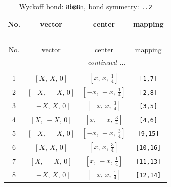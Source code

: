 \documentclass[fleqn,8pt]{jsarticle}
\begin{document}
\begin{longtable}{cccc}
\caption{Wyckoff bond: {\tt 8b@8n}, bond symmetry: {\tt ..2}}
 \\
 \hline \hline
No. & vector & center & mapping \\ \hline \endfirsthead

\multicolumn{3}{l}{\tablename\ \thetable{}} \\
 \hline \hline
No. & vector & center & mapping \\ \hline \endhead

 \hline \hline
\multicolumn{3}{r}{\footnotesize\it continued ...} \\ \endfoot

 \hline \hline
\multicolumn{3}{r}{} \\ \endlastfoot

1 & $\left[ X,\, X,\, 0 \right]$ & $\left[ x,\, x,\, \frac{1}{4} \right]$ & {\tt [1,7]} \\ \hline
2 & $\left[ - X,\, - X,\, 0 \right]$ & $\left[ - x,\, - x,\, \frac{1}{4} \right]$ & {\tt [2,8]} \\ \hline
3 & $\left[ - X,\, X,\, 0 \right]$ & $\left[ - x,\, x,\, \frac{3}{4} \right]$ & {\tt [3,5]} \\ \hline
4 & $\left[ X,\, - X,\, 0 \right]$ & $\left[ x,\, - x,\, \frac{3}{4} \right]$ & {\tt [4,6]} \\ \hline
5 & $\left[ - X,\, - X,\, 0 \right]$ & $\left[ - x,\, - x,\, \frac{3}{4} \right]$ & {\tt [9,15]} \\ \hline
6 & $\left[ X,\, X,\, 0 \right]$ & $\left[ x,\, x,\, \frac{3}{4} \right]$ & {\tt [10,16]} \\ \hline
7 & $\left[ X,\, - X,\, 0 \right]$ & $\left[ x,\, - x,\, \frac{1}{4} \right]$ & {\tt [11,13]} \\ \hline
8 & $\left[ - X,\, X,\, 0 \right]$ & $\left[ - x,\, x,\, \frac{1}{4} \right]$ & {\tt [12,14]} \\
\end{longtable}
\renewcommand{\arraystretch}{1.2}
\end{document}

